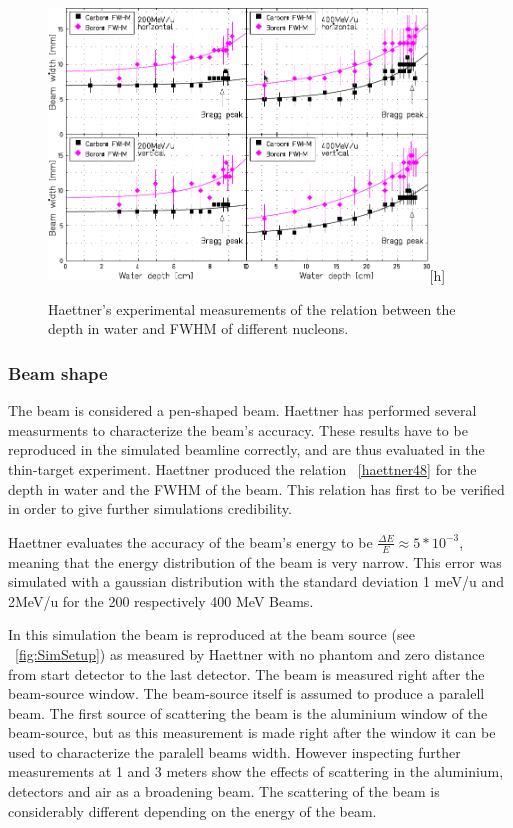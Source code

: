 \begin{figure}[h] 
\begin{center}
\includegraphics[width=0.9\textwidth]{images/haettner48.png}[h]  
\caption{\label{fig:haettner48} Haettner's experimental measurements of the relation between the depth in water and FWHM of different nucleons.}
 \end{center}
 \end{figure}

\subsubsection{Beam shape}


The beam is considered a pen-shaped beam. Haettner has performed several measurments to characterize the beam's accuracy. These results have to be reproduced in the simulated beamline correctly, and are thus evaluated in the thin-target experiment. Haettner produced the relation ~\ref{haettner48} for the depth in water and the FWHM of the beam. This relation has first to be verified in order to give further simulations credibility.

Haettner evaluates the accuracy of the beam's energy to be $\frac{\Delta E}{E}\approx5*10^{-3}$, meaning that the energy distribution of the beam is very narrow. This error was simulated with a gaussian distribution with the standard deviation 1 meV/u and 2MeV/u for the 200 respectively 400 MeV Beams.

In this simulation the beam is reproduced at the beam source (see ~\ref{fig:SimSetup}) as measured by Haettner with no phantom and zero distance from start detector to the last detector. The beam is measured right after the beam-source window. The beam-source itself is assumed to produce a paralell beam. The first source of scattering the beam is the aluminium window of the beam-source, but as this measurement is made right after the window it can be used to characterize the paralell beams width. However inspecting further measurements at 1 and 3 meters show the effects of scattering in the aluminium, detectors and air as a broadening beam. The scattering of the beam is considerably different depending on the energy of the beam.

